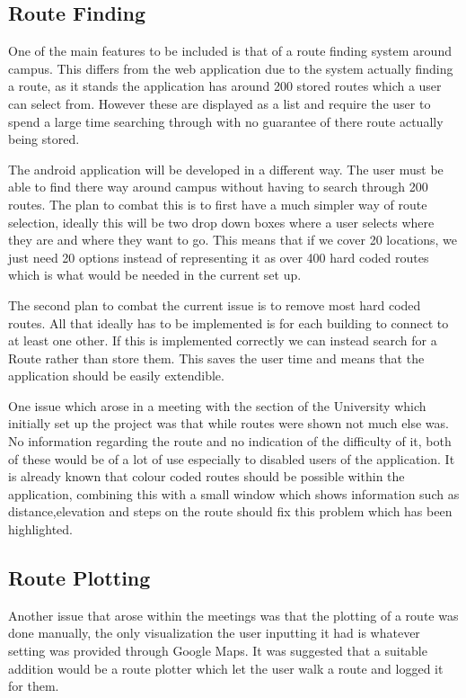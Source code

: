 \documentclass[10pt,a4paper]{article}
\begin{document}
\subsection{Route Finding}
One of the main features to be included is that of a route finding system around campus. This differs from the web application due to the system actually finding a route, as it stands the application has around 200 stored routes which a user can select from. However these are displayed as a list and require the user to spend a large time searching through with no guarantee of there route actually being stored.

The android application will be developed in a different way. The user must be able to find there way around campus without having to search through 200 routes. The plan to combat this is to first have a much simpler way of route selection, ideally this will be two drop down boxes where a user selects where they are and where they want to go. This means that if we cover 20 locations, we just need 20 options instead of representing it as over 400 hard coded routes which is what would be needed in the current set up. 

The second plan to combat the current issue is to remove most hard coded routes. All that ideally has to be implemented is for each building to connect to at least one other. If this is implemented correctly we can instead search for a Route rather than store them. This saves the user time and means that the application should be easily extendible. 

One issue which arose in a meeting with the section of the University which initially set up the project was that while routes were shown not much else was. No information regarding the route and no indication of the difficulty of it, both of these would be of a lot of use especially to disabled users of the application. It is already known that colour coded routes should be possible within the application, combining this with a small window which shows information such as distance,elevation and steps on the route should fix this problem which has been highlighted. 
\subsection{Route Plotting}
Another issue that arose within the meetings was that the plotting of a route was done manually, the only visualization the user inputting it had is whatever setting was provided through Google Maps. It was suggested that a suitable addition would be a route plotter which let the user walk a route and logged it for them. 
\end{document}
